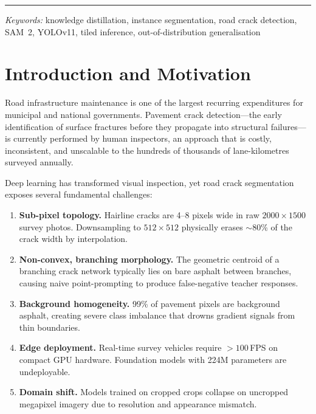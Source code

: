 \documentclass[12pt,a4paper]{article}
\begin{document}
\begin{titlepage}
\vspace{0.8cm}\rule{11cm}{0.4pt}\vspace{0.5cm}

\textit{Keywords:} knowledge distillation, instance segmentation, road crack
detection, SAM~2, YOLOv11, tiled inference, out-of-distribution generalisation

\end{titlepage}

\tableofcontents\clearpage

\section{Introduction and Motivation}
\label{sec:intro}

Road infrastructure maintenance is one of the largest recurring expenditures
for municipal and national governments.
Pavement crack detection---the early identification of surface fractures before
they propagate into structural failures---is currently performed by human
inspectors, an approach that is costly, inconsistent, and unscalable to the
hundreds of thousands of lane-kilometres surveyed annually.

Deep learning has transformed visual inspection, yet road crack segmentation
exposes several fundamental challenges:

\begin{enumerate}[leftmargin=1.5em]
  \item \textbf{Sub-pixel topology.} Hairline cracks are 4--8 pixels wide in
    raw $2000\times1500$ survey photos. Downsampling to $512\times512$ physically
    erases $\sim$80\% of the crack width by interpolation.
  \item \textbf{Non-convex, branching morphology.} The geometric centroid of a
    branching crack network typically lies on bare asphalt between branches,
    causing naive point-prompting to produce false-negative teacher responses.
  \item \textbf{Background homogeneity.} 99\% of pavement pixels are background
    asphalt, creating severe class imbalance that drowns gradient signals from
    thin boundaries.
  \item \textbf{Edge deployment.} Real-time survey vehicles require $>100$\,FPS
    on compact GPU hardware. Foundation models with 224M parameters are
    undeployable.
  \item \textbf{Domain shift.} Models trained on cropped crops collapse on
    uncropped megapixel imagery due to resolution and appearance mismatch.
\end{enumerate}
\end{document}
